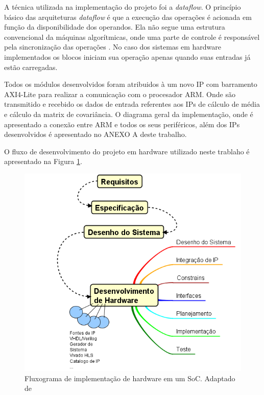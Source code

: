 A técnica utilizada na implementação do projeto foi a \textit{dataflow}. O princípio básico das arquiteturas \textit{dataflow} é que a execução das operações é acionada em função da disponibilidade dos operandos. Ela não segue uma estrutura convencional da máquinas algorítmicas, onde uma parte de controle é responsável pela sincronização das operações \cite{ThiagoUnB}. No caso dos sistemas em hardware implementados os blocos iniciam sua operação apenas quando suas entradas já estão carregadas.

Todos os módulos desenvolvidos foram atribuidos à um novo IP com barramento AXI4-Lite para realizar a comunicação com o procesador ARM. Onde são transmitido e recebido os dados de entrada referentes aos IPs de cálculo de média e cálculo da matrix de covariância. O diagrama geral da implementação, onde é apresentado a conexão entre ARM e todos os seus periféricos, além dos IPs desenvolvidos é apresentado no ANEXO A deste trabalho.

O fluxo de desenvolvimento do projeto em hardware utilizado neste trablaho é apresentado na Figura \ref{diagram_hardware}.

\begin{figure}[h]
  \centering
  \includegraphics[keepaspectratio=true,scale=1.0]{figuras/fluxograma_hardware.PNG}
  \caption{Fluxograma de implementação de hardware em um SoC. Adaptado de \cite{zynqBook}}
  \label{diagram_hardware}
\end{figure}

